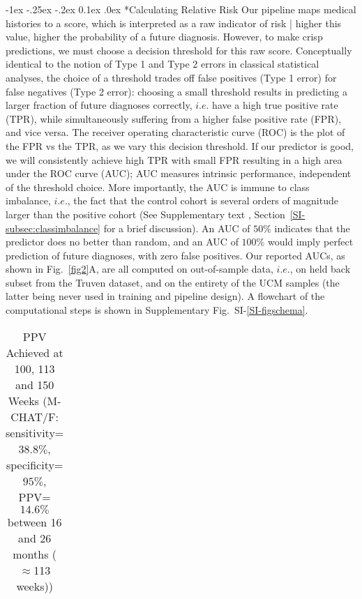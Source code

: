 \documentclass[onecolumn,,10pt]{IEEEtran}
\makeatletter
\renewcommand\subsection{\@startsection {section}{1}{\z@}%
  {-1ex \@plus -.25ex \@minus -.2ex}%
  {0.1ex \@plus.0ex}%
  {\fontsize{11}{12}\selectfont\bfseries\sffamily\color{DodgerBlue4}}}
\renewcommand{\captionN}[1]{\caption{\color{CadetBlue4!80!black} \sffamily \fontsize{9}{10}\selectfont #1  }}
\def\treatment{positive\xspace}
\makeatother
\begin{document}
\subsection*{Calculating Relative Risk}
Our pipeline maps medical histories to a  score, which is interpreted as a raw indicator of 
risk | higher this value, higher the probability of a future diagnosis. However, to make crisp predictions, we must choose  a decision threshold for this raw score. Conceptually identical to the notion of Type 1 and Type 2 errors in classical statistical analyses, the choice of a threshold trades off false positives (Type 1 error) for false negatives (Type 2 error): choosing a small threshold  results in predicting a larger fraction of future diagnoses correctly, $i.e.$ have a high true positive rate (TPR), while simultaneously suffering from a higher false positive rate (FPR), and vice versa. The receiver operating characteristic curve (ROC) is the plot of the  FPR vs the TPR, as we vary this decision threshold. If our predictor is good, we will consistently achieve high TPR with small FPR resulting in a high area under the ROC curve (AUC); AUC measures  intrinsic performance, independent of the threshold choice. More importantly, the AUC is  immune to class imbalance, $i.e.$, the fact that the control cohort is several orders of magnitude larger than the \treatment cohort (See Supplementary text , Section~\ref{SI-subsec:classimbalance} for a brief discussion). An AUC of $50\%$ indicates that the predictor does no better  than random, and an AUC of $100\%$ would imply perfect prediction of future diagnoses, with zero false positives. Our reported AUCs, as shown in Fig.~\ref{fig2}A, are all computed on out-of-sample data, $i.e.$, on held back subset from the Truven dataset, and on the entirety of the UCM samples (the latter being never used in training and pipeline design).
A flowchart of the computational steps is shown in Supplementary Fig.~SI-\ref{SI-figschema}.
\begin{table}[t]   
\centering 
\captionN{PPV Achieved at 100, 113 and 150 Weeks (M-CHAT/F:  sensitivity=$38.8\%$, specificity=$95\%$, PPV=$14.6\%$ between 16 and  26 months ($\approx$113 weeks))}\label{tabssp}
\begin{tabular}{L{.75in}|L{.75in}|L{.75in}|L{.5in}|L{.5in}|L{.75in}}
\hline

\end{tabular}
\end{table}  
\end{document}
